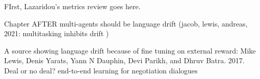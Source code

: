 FIrst, Lazaridou's metrics review goes here.

Chapter AFTER multi-agents should be language drift (jacob, lewis, andreas, 2021: multitasking inhibits drift )

A source showing language drift because of fine tuning on external reward: Mike Lewis, Denis Yarats, Yann N Dauphin, Devi
Parikh, and Dhruv Batra. 2017. Deal or no deal?
end-to-end learning for negotiation dialogues